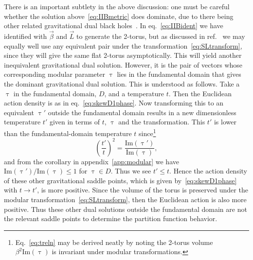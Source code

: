 There is an important subtlety in the above discussion: one must be careful whether the solution above~\eqref{eq:IIBmetric} does dominate, due to there being other related gravitational dual black holes~\cite{Aharony:2005ew}.
In eq.~\eqref{eq:IIBident} we have identified with $\vec{\beta}$ and $\vec{L}$ to generate the 2-torus, but as discussed in ref.~\cite{Aharony:2005ew} we may equally well use any equivalent pair under the transformation~\eqref{eq:SLtransform}, since they will give the same flat 2-torus asymptotically.
This will yield another inequivalent gravitational dual solution.
However, it is the pair of vectors whose corresponding modular parameter $\uptau$ lies in the fundamental domain that gives the dominant gravitational dual solution.
This is understood as follows.
Take a $\uptau$ in the fundamental domain, $D$, and a temperature $t$.
Then the Euclidean action density is as in eq.~\eqref{eq:skewD1phase}.
Now transforming this to an equivalent $\uptau'$ outside the fundamental domain results in a new dimensionless temperature $t'$ given in terms of $t$, $\uptau$ and the transformation.
This $t'$ is lower than the fundamental-domain temperature $t$ since\footnote{Eq.~\eqref{eq:treln} may be derived neatly by noting the 2-torus volume $\beta^2 \mathrm{Im}(\uptau)$ is invariant under modular transformations.}
\begin{equation}
  \label{eq:treln}
  \left(\frac{t'}{t}\right)^2 = \frac{\mathrm{Im}(\uptau')}{\mathrm{Im}(\uptau)},
\end{equation}
and from the corollary in appendix~\ref{app:modular} we have $\mathrm{Im}(\uptau') / \mathrm{Im}(\uptau) \le 1$ for $\uptau \in D$.
Thus we see $t' \le t$.
Hence the action density of these other gravitational saddle points, which is given by~\eqref{eq:skewD1phase} with $t \to t'$, is more positive.
Since the volume of the torus is preserved under the modular transformation~\eqref{eq:SLtransform}, then the Euclidean action is also more positive.
Thus these other dual solutions outside the fundamental domain are not the relevant saddle points to determine the partition function behavior.

